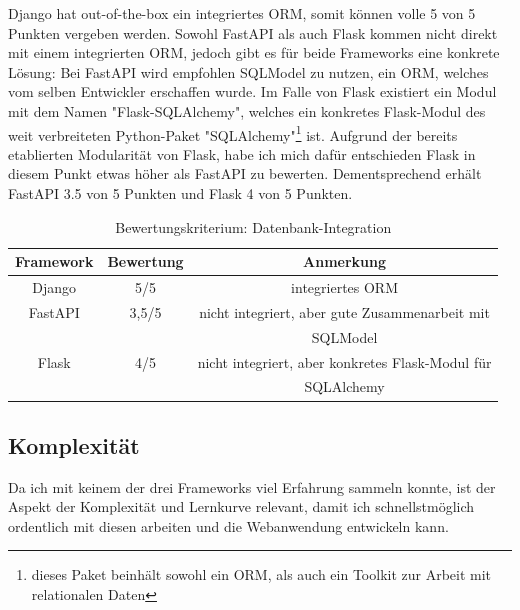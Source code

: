 \documentclass[letterpaper,11pt,leqno]{article}
\begin{document}
Django hat out-of-the-box ein integriertes ORM, somit können volle 5 von 5 Punkten vergeben werden. Sowohl FastAPI als auch Flask
kommen nicht direkt mit einem integrierten ORM, jedoch gibt es für beide Frameworks eine konkrete Lösung: Bei FastAPI wird empfohlen
SQLModel zu nutzen, ein ORM, welches vom selben Entwickler erschaffen wurde. Im Falle von Flask existiert ein Modul mit dem Namen
"Flask-SQLAlchemy", welches ein konkretes Flask-Modul des weit verbreiteten Python-Paket "SQLAlchemy"\footnote{dieses Paket beinhält
sowohl ein ORM, als auch ein Toolkit zur Arbeit mit relationalen Daten} ist. Aufgrund der bereits etablierten Modularität von Flask,
habe ich mich dafür entschieden Flask in diesem Punkt etwas höher als FastAPI zu bewerten. Dementsprechend erhält FastAPI 3.5 von 5
Punkten und Flask 4 von 5 Punkten.\clearpage%
\begin{table}[h!]
	\begin{center}
		\begin{tabular}{|c||c|c|}
			\hline
			Framework & Bewertung & Anmerkung\\
			\hline\hline
			Django & 5/5 & integriertes ORM\\
			FastAPI & 3,5/5 & nicht integriert, aber gute Zusammenarbeit mit\\
			& & SQLModel\\
			Flask & 4/5 & nicht integriert, aber konkretes Flask-Modul für\\
			& & SQLAlchemy\\
			\hline
		\end{tabular}
		\caption{Bewertungskriterium: Datenbank-Integration}
	\end{center}
	\label{table:3}
\end{table}

\subsection{Komplexität}
Da ich mit keinem der drei Frameworks viel Erfahrung sammeln konnte, ist der Aspekt der Komplexität und Lernkurve relevant, damit
ich schnellstmöglich ordentlich mit diesen arbeiten und die Webanwendung entwickeln kann.
\end{document}
